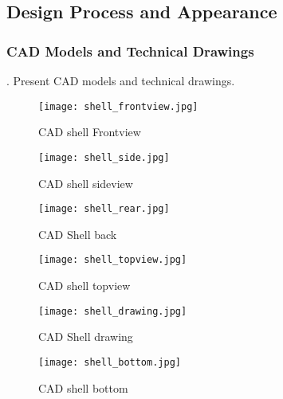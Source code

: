 \subsection{Design Process and Appearance}
\subsubsection{CAD Models and Technical Drawings}
.  Present CAD models and technical drawings.
\begin{figure}[!ht]
  \centering
  \begin{minipage}[b]{0.45\linewidth}
    \texttt{[image: shell\_frontview.jpg]}
    \caption{CAD shell Frontview}
    \label{fig:shell_frontview}
  \end{minipage}
  \hspace{0.5cm}
  \begin{minipage}[b]{0.45\linewidth}
    \texttt{[image: shell\_side.jpg]}
    \caption{CAD shell sideview}
    \label{fig:shell_sideview}
  \end{minipage}
\end{figure}

\begin{figure}[!ht]
  \centering
  \begin{minipage}[b]{0.45\linewidth}
    \texttt{[image: shell\_rear.jpg]}
    \caption{CAD Shell back}
    \label{fig:shell_back}
  \end{minipage}
  \hspace{0.5cm}
  \begin{minipage}[b]{0.45\linewidth}
    \texttt{[image: shell\_topview.jpg]}
    \caption{CAD shell topview}
    \label{fig:shell_topview}
  \end{minipage}
\end{figure}

\begin{figure}[!ht]
  \centering
  \begin{minipage}[b]{0.45\linewidth}
    \texttt{[image: shell\_drawing.jpg]}
    \caption{CAD Shell drawing }
    \label{fig:shell_drawing}
  \end{minipage}
  \hspace{0.5cm}
  \begin{minipage}[b]{0.45\linewidth}
    \texttt{[image: shell\_bottom.jpg]}
    \caption{CAD shell bottom}
    \label{fig:shell_bottom}
  \end{minipage}
\end{figure}
\par %

